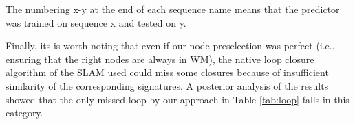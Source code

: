 \documentclass[letterpaper, 10 pt, conference]{ieeeconf}  %
\begin{document}
\begin{table}[t]
\centering
\caption{Relocalization results}
\label{tab:relocalization}
The numbering x-y at the end of each sequence name means that the predictor was trained on sequence x and tested on y.
\vspace{-0.5cm}
\end{table}


Finally, its is worth noting that even if our node preselection was perfect (i.e., ensuring that the right nodes are always in WM), the native loop closure algorithm of the SLAM used could miss some closures because of insufficient similarity of the corresponding signatures. A posterior analysis of the results showed that the only missed loop by our approach in Table \ref{tab:loop} falls in this category.
\end{document}
